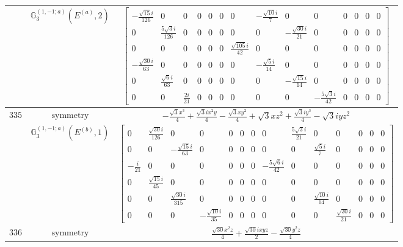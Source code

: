 \documentclass[fleqn,8pt,landscape]{jsarticle}
\begin{document}
\begin{longtable}{ccc}
$  $ & $ \mathbb{G}_{3}^{(1,-1;a)}(E^{(a)},2) $ & $ \begin{bmatrix} - \frac{\sqrt{15} i}{126} & 0 & 0 & 0 & 0 & 0 & 0 & - \frac{\sqrt{10} i}{7} & 0 & 0 & 0 & 0 & 0 & 0 \\ 0 & \frac{5 \sqrt{3} i}{126} & 0 & 0 & 0 & 0 & 0 & 0 & - \frac{\sqrt{30} i}{21} & 0 & 0 & 0 & 0 & 0 \\ 0 & 0 & 0 & 0 & 0 & 0 & \frac{\sqrt{105} i}{42} & 0 & 0 & 0 & 0 & 0 & 0 & 0 \\ - \frac{\sqrt{30} i}{63} & 0 & 0 & 0 & 0 & 0 & 0 & - \frac{\sqrt{5} i}{14} & 0 & 0 & 0 & 0 & 0 & 0 \\ 0 & \frac{\sqrt{6} i}{63} & 0 & 0 & 0 & 0 & 0 & 0 & - \frac{\sqrt{15} i}{14} & 0 & 0 & 0 & 0 & 0 \\ 0 & 0 & \frac{2 i}{21} & 0 & 0 & 0 & 0 & 0 & 0 & - \frac{5 \sqrt{3} i}{42} & 0 & 0 & 0 & 0 \end{bmatrix} $ \\ \hline
$ 335 $ & $ \text{symmetry} $ & $ - \frac{\sqrt{3} x^{3}}{4} + \frac{\sqrt{3} i x^{2} y}{4} - \frac{\sqrt{3} x y^{2}}{4} + \sqrt{3} x z^{2} + \frac{\sqrt{3} i y^{3}}{4} - \sqrt{3} i y z^{2} $ \\
$  $ & $ \mathbb{G}_{3}^{(1,-1;a)}(E^{(b)},1) $ & $ \begin{bmatrix} 0 & \frac{\sqrt{30} i}{126} & 0 & 0 & 0 & 0 & 0 & 0 & \frac{5 \sqrt{3} i}{21} & 0 & 0 & 0 & 0 & 0 \\ 0 & 0 & - \frac{\sqrt{15} i}{63} & 0 & 0 & 0 & 0 & 0 & 0 & \frac{\sqrt{5} i}{7} & 0 & 0 & 0 & 0 \\ - \frac{i}{21} & 0 & 0 & 0 & 0 & 0 & 0 & - \frac{5 \sqrt{6} i}{42} & 0 & 0 & 0 & 0 & 0 & 0 \\ 0 & \frac{\sqrt{15} i}{45} & 0 & 0 & 0 & 0 & 0 & 0 & 0 & 0 & 0 & 0 & 0 & 0 \\ 0 & 0 & \frac{\sqrt{30} i}{315} & 0 & 0 & 0 & 0 & 0 & 0 & \frac{\sqrt{10} i}{14} & 0 & 0 & 0 & 0 \\ 0 & 0 & 0 & - \frac{\sqrt{10} i}{35} & 0 & 0 & 0 & 0 & 0 & 0 & \frac{\sqrt{30} i}{21} & 0 & 0 & 0 \end{bmatrix} $ \\ \hline
$ 336 $ & $ \text{symmetry} $ & $ \frac{\sqrt{30} x^{2} z}{4} + \frac{\sqrt{30} i x y z}{2} - \frac{\sqrt{30} y^{2} z}{4} $ \\

\end{longtable}
\end{document}
